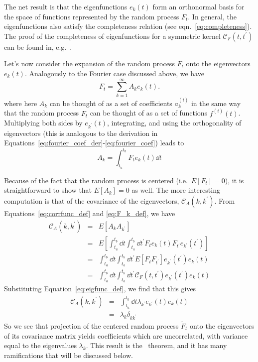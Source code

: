 The net result is that the eigenfunctions $e_k(t)$ form an orthonormal
basis for the space of functions represented by the random process $F_t$.
In general, the eigenfunctions
also satisfy the completeness relation (see eqn.~\ref{eq:completeness}).
The proof of the completeness of eigenfunctions for a symmetric kernel
$\mathcal{C}_F(t, t^\prime)$ can be found in, e.g.~\citet{Courant1989}.

Let's now consider the expansion of the random process $F_t$ onto the
eigenvectors $e_k(t)$.  Analogously to the Fourier case discussed
above, we have
\begin{equation}
  \label{eq:Ft_decomp}
  F_t = \sum_{k=1}^\infty A_k e_k(t).
\end{equation}
where here $A_k$ can be thought of as a set of coefficients $a_k^{(i)}$
in the same way that the random process $F_t$ can be thought of as a
set of functions $f^{(i)}(t)$.
Multiplying both sides by $e_{k^\prime}(t)$, integrating, and using the
orthogonality of eigenvectors (this is analogous to the derivation
in Equations~\ref{eq:fourier_coef_der}-\ref{eq:fourier_coef}) leads to
\begin{equation}
  \label{eq:F_k_def}
  A_k = \int_{t_a}^{t_b} F_t e_k(t) \dd t
\end{equation}

Because of the fact that the random process is centered (i.e.~$E[F_t] = 0$),
it is straightforward to show that $E[A_k] = 0$ as well.  The more interesting
computation is that of the covariance of the eigenvectors,
$\mathcal{C}_A(k, k^\prime)$.
From Equations~\ref{eq:corrfunc_def} and \ref{eq:F_k_def}, we have
\begin{eqnarray}
  \mathcal{C}_A(k, k^\prime)
  &=& E[A_k A_{k^\prime}]\nonumber\\
  &=& E\left[\int_{t_a}^{t_b} \dd t \int_{t_a}^{t_b} \dd t^\prime
    {F}_t e_k(t)
    {F}_{t^\prime} e_{k^\prime}(t^\prime)\right] \nonumber\\
  &=& \int_{t_a}^{t_b} \dd t \int_{t_a}^{t_b} \dd t^\prime
    E[{F}_t {F}_{t^\prime}]
    e_{k^\prime}(t^\prime) e_k(t) \nonumber\\
  &=& \int_{t_a}^{t_b} \dd t \int_{t_a}^{t_b} \dd t^\prime
    \mathcal{C}_F(t, t^\prime)
    e_{k^\prime}(t^\prime) e_k(t) \nonumber
\end{eqnarray}
Substituting Equation~\ref{eq:eigfunc_def}, we find that this gives
\begin{eqnarray}
  \label{eq:cov_A}
  \mathcal{C}_A(k, k^\prime)
  &=& \int_{t_a}^{t_b} \dd t \lambda_{k^\prime} e_{k^\prime}(t) e_k(t) \nonumber\\
  &=& \lambda_k \delta_{kk^\prime}
\end{eqnarray}
So we see that projection of the centered random process $\tilde{F}_t$ onto
the eigenvectors of its covariance matrix yields coefficients which
are uncorrelated, with variance equal to the eigenvalues $\lambda_k$.
This result is the \KL\ theorem, and it has many ramifications that will
be discussed below.

